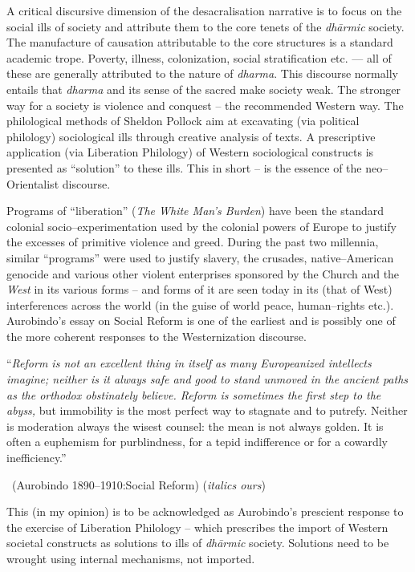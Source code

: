 A critical discursive dimension of the desacralisation narrative is to focus on the social ills of society and attribute them to the core tenets of the \textit{dhārmic} society. The manufacture of causation attributable to the core structures is a standard academic trope. Poverty, illness, colonization, social stratification etc. — all of these are generally attributed to the nature of \textit{dharma}. This discourse normally entails that \textit{dharma} and its sense of the sacred make society weak. The stronger way for a society is violence and conquest – the recommended Western way. The philological methods of Sheldon Pollock aim at excavating (via political philology) sociological ills through creative analysis of texts. A prescriptive application (via Liberation Philology) of Western sociological constructs is presented as “solution” to these ills. This in short – is the essence of the neo–Orientalist discourse.

Programs of “liberation” (\textit{The White Man's Burden}) have been the standard colonial socio–experimentation used by the colonial powers of Europe to justify the excesses of primitive violence and greed. During the past two millennia, similar “programs” were used to justify slavery, the crusades, native–American genocide and various other violent enterprises sponsored by the Church and the \textit{West} in its various forms – and forms of it are seen today in its (that of West) interferences across the world (in the guise of world peace, human–rights etc.). Aurobindo's essay on Social Reform is one of the earliest and is possibly one of the more coherent responses to the Westernization discourse.

\begin{myquote}
“\textit{Reform is not an excellent thing in itself as many Europeanized intellects imagine; neither is it always safe and good to stand unmoved in the ancient paths as the orthodox obstinately believe. Reform is sometimes the first step to the abyss,} but immobility is the most perfect way to stagnate and to putrefy. Neither is moderation always the wisest counsel: the mean is not always golden. It is often a euphemism for purblindness, for a tepid indifference or for a cowardly inefficiency.” 

~\hfill (Aurobindo 1890–1910:Social Reform) (\textit{italics ours})
\end{myquote}

This (in my opinion) is to be acknowledged as Aurobindo's prescient response to the exercise of Liberation Philology – which prescribes the import of Western societal constructs as solutions to ills of \textit{dhārmic} society. Solutions need to be wrought using internal mechanisms, not imported.

